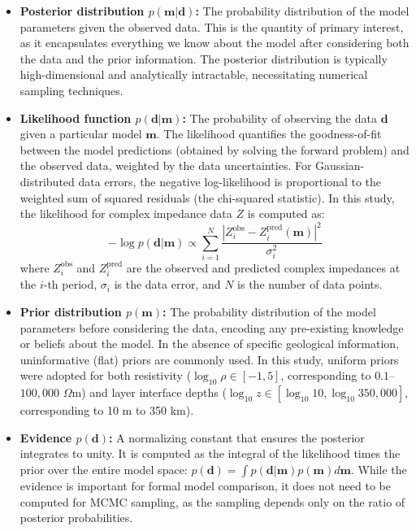 \begin{itemize}
    \item \textbf{Posterior distribution $p(\mathbf{m} | \mathbf{d})$:} The probability distribution of the model parameters given the observed data. This is the quantity of primary interest, as it encapsulates everything we know about the model after considering both the data and the prior information. The posterior distribution is typically high-dimensional and analytically intractable, necessitating numerical sampling techniques.

    \item \textbf{Likelihood function $p(\mathbf{d} | \mathbf{m})$:} The probability of observing the data $\mathbf{d}$ given a particular model $\mathbf{m}$. The likelihood quantifies the goodness-of-fit between the model predictions (obtained by solving the forward problem) and the observed data, weighted by the data uncertainties. For Gaussian-distributed data errors, the negative log-likelihood is proportional to the weighted sum of squared residuals (the chi-squared statistic). In this study, the likelihood for complex impedance data $Z$ is computed as:
    \begin{equation}
    -\log p(\mathbf{d}|\mathbf{m}) \propto \sum_{i=1}^{N} \frac{|Z_i^{\text{obs}} - Z_i^{\text{pred}}(\mathbf{m})|^2}{\sigma_i^2}
    \end{equation}
    where $Z_i^{\text{obs}}$ and $Z_i^{\text{pred}}$ are the observed and predicted complex impedances at the $i$-th period, $\sigma_i$ is the data error, and $N$ is the number of data points.

    \item \textbf{Prior distribution $p(\mathbf{m})$:} The probability distribution of the model parameters before considering the data, encoding any pre-existing knowledge or beliefs about the model. In the absence of specific geological information, uninformative (flat) priors are commonly used. In this study, uniform priors were adopted for both resistivity ($\log_{10}\rho \in [-1, 5]$, corresponding to $0.1$--$100{,}000$ $\Omega$m) and layer interface depths ($\log_{10}z \in [\log_{10}10, \log_{10}350{,}000]$, corresponding to 10 m to 350 km).

    \item \textbf{Evidence $p(\mathbf{d})$:} A normalizing constant that ensures the posterior integrates to unity. It is computed as the integral of the likelihood times the prior over the entire model space: $p(\mathbf{d}) = \int p(\mathbf{d}|\mathbf{m}) p(\mathbf{m}) d\mathbf{m}$. While the evidence is important for formal model comparison, it does not need to be computed for MCMC sampling, as the sampling depends only on the ratio of posterior probabilities.
\end{itemize}


